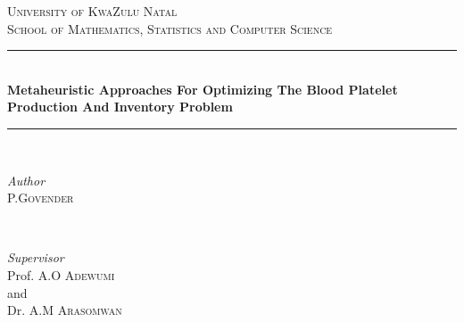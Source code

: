 \documentclass[12pt]{article}
\begin{document}
\begin{titlepage} %



	\newcommand{\HRule}{\rule{\linewidth}{0.5mm}} %
	
	\center %
	
	
	\begin {center}
\end {center}
	\textsc{\small University of KwaZulu Natal\\ School of Mathematics, Statistics and Computer Science}\\[0.5cm] %
	
	
	
	\HRule\\[0.4cm]
	
	{\huge\bfseries Metaheuristic Approaches For Optimizing The Blood Platelet Production And Inventory Problem}\\[0.4cm] %
	
	\HRule\\[1.5cm]
	
	
	\begin{minipage}{0.4\textwidth}
		\begin{flushleft}
			\large
			\textit{Author}\\
			 \textsc{P.Govender} %

		\end{flushleft}
	\end{minipage}
	~
	\begin{minipage}{0.4\textwidth}
		\begin{flushright}
			\large
			\textit{Supervisor}\\
			Prof. A.O \textsc{Adewumi}\\ and\\ Dr. A.M \textsc{Arasomwan}%


\end{flushright}
\end{minipage}
\end{titlepage}
\end{document}
